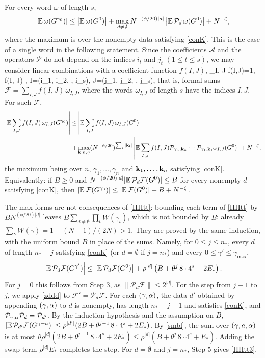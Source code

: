 \medskip
{} For every word $\omega$ of length $s$,
\begin{equation} \label{HHtt2}
\left|\mathbb{E}\, \omega(G^{\gamma_0})\right|\leq \left|\mathbb{E}\, \omega(G^0)\right|+\max_{d\ne\emptyset}N^{-(\phi/20)|d|}\left|\mathbb{E}\,\mathcal P_d\,\omega(G^0)\right|+N^{-\zeta},
\end{equation}
where the maximum is over the nonempty data satisfying \eqref{conK}. This is the case of a single word in the following statement. Since the coefficients $\mathcal A$ and the operators $\mathcal P$ do not depend on the indices $i_t$ and $j_t$ $(1 \leq t \leq s)$, we may consider linear combinations with a coefficient function $f(I,J)$,
\be\label{fIJ}
\sum_{I, J} f(I,J)=1, {  \quad f(I, J) , }\quad I=(i_1, i_2, \cdots, i_s), \quad  J=(j_1, j_2, \cdots, j_s),
\ee
that is, formal sums $\mathcal F=\sum_{I,J}f(I,J)\,\omega_{I,J}$, where the words $\omega_{I,J}$ of length $s$ have the indices $I,J$. For such $\mathcal F$,
\begin{align}\label{HHtt3}
\left|\mathbb{E}\sum_{I,J} f(I,J)\,\omega_{I,J}(G^{\gamma_0})\right|
\leq& \left|\mathbb{E} \sum_{I,J} f(I,J)\,\omega_{I,J}(G^0)\right|\\\nonumber
+&\max_{ {\bf k}, n, \gamma } (N^{-\phi/20})^{\sum_i |{\bf k_i}|}
\left|\mathbb{E} \sum_{I,J} f(I,J) \mathcal P_{\gamma_n, {\bf k}_n}\cdots \mathcal P_{\gamma_1, {\bf k}_1} \omega_{I,J}(G^0)\right|+N^{-\zeta},
\end{align}
the maximum being over $n$, $\gamma_1,\dots,\gamma_n$ and ${\bf k}_1,\dots,{\bf k}_n$ satisfying \eqref{conK}. Equivalently: if $B\ge0$ and $N^{-(\phi/20)|d|}|\mathbb{E}\,\mathcal P_d\mathcal F(G^0)|\le B$ for every nonempty $d$ satisfying \eqref{conK}, then $|\mathbb{E}\,\mathcal F(G^{\gamma_0})|\le|\mathbb{E}\,\mathcal F(G^0)|+B+N^{-\zeta}$.

The max forms are not consequences of \eqref{HHtt}: bounding each term of \eqref{HHtt} by $B N^{(\phi/20)|d|}$ leaves $B\sum_{d\ne\emptyset}\prod_tW(\gamma_t)$, which is not bounded by $B$: already $\sum_\gamma W(\gamma)=1+(N-1)/(2N)>1$. They are proved by the same induction, with the uniform bound $B$ in place of the sums. Namely, for $0\le j\le n_*$, every $d$ of length $n_*-j$ satisfying \eqref{conK} (or $d=\emptyset$ if $j=n_*$) and every $0\le\gamma'\le\gamma_{\max}$,
$$
\left|\mathbb{E}\,\mathcal P_d\mathcal F(G^{\gamma'})\right|\le\left|\mathbb{E}\,\mathcal P_d\mathcal F(G^0)\right|+\rho^{|d|}\left(B+\theta^j\,8\cdot4^s+2E_*\right).
$$
For $j=0$ this follows from Step 3, as $\|\mathcal P_d\mathcal F\|\le2^{|d|}$. For the step from $j-1$ to $j$, we apply \eqref{zddd} to $\mathcal F'=\mathcal P_d\mathcal F$. For each $(\gamma,\alpha)$, the data $d'$ obtained by appending $(\gamma,\alpha)$ to $d$ is nonempty, has length $n_*-j+1$ and satisfies \eqref{conK}, and $\mathcal P_{\gamma,\alpha}\mathcal P_d=\mathcal P_{d'}$. By the induction hypothesis and the assumption on $B$, $|\mathbb{E}\,\mathcal P_{d'}\mathcal F(G^{\gamma-a})|\le\rho^{|d'|}(2B+\theta^{j-1}\,8\cdot4^s+2E_*)$. By \eqref{smbl}, the sum over $(\gamma,a,\alpha)$ is at most $\theta\rho^{|d|}(2B+\theta^{j-1}\,8\cdot4^s+2E_*)\le\rho^{|d|}(B+\theta^j\,8\cdot4^s+E_*)$. Adding the swap term $\rho^{|d|}E_*$ completes the step. For $d=\emptyset$ and $j=n_*$, Step 5 gives \eqref{HHtt3}.

